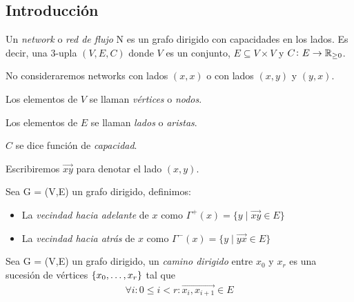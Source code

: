 \subsection{Introducción}

\begin{definition}
  Un \emph{network} o \emph{red de flujo}  N es un grafo dirigido con capacidades
  en los lados. Es decir, una $3$-upla $(V, E, C)$ donde $V$ es un conjunto,
  $E \subseteq V \times V$ y $C \colon E \to \mathbb{R}_{\ge 0}$.

  No consideraremos networks con lados $(x,x)$ o con lados $(x,y)$ y $(y,x)$.
\end{definition}

\begin{notation}
  Los elementos de $V$ se llaman \emph{vértices} o \emph{nodos}.

  Los elementos de $E$ se llaman \emph{lados} o \emph{aristas}.

  $C$ se dice función de \emph{capacidad}.

  Escribiremos $\overrightarrow{xy}$ para denotar el lado $(x,y)$.
\end{notation}

\begin{definition}
  Sea G = (V,E) un grafo dirigido, definimos:
  \begin{itemize}
  \item La \emph{vecindad hacia adelante} de $x$ como
    $\Gamma^{+}(x) = \{y\mid \overrightarrow{xy} \in E\}$
  \item La \emph{vecindad hacia atrás} de $x$ como
    $\Gamma^{-}(x) = \{y\mid \overrightarrow{yx} \in E\}$
  \end{itemize}
\end{definition}

\begin{definition}
  Sea G = (V,E) un grafo dirigido, un \emph{camino dirigido} entre $x_0$ y $x_r$
  es una sucesión de vértices $\{x_0,\mathellipsis, x_r\}$ tal que
  \begin{align}
    \forall i: 0\le i < r : \overrightarrow{x_i,x_{i+1}} \in E
  \end{align}
\end{definition}

